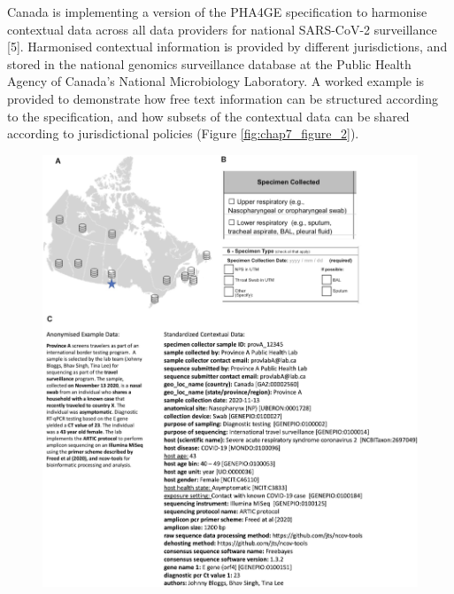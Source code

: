 Canada is implementing a version of the PHA4GE specification to harmonise contextual data across all data providers for national SARS-CoV-2 surveillance [5]. Harmonised contextual information is provided by different jurisdictions, and stored in the national genomics surveillance database at the Public Health Agency of Canada’s National Microbiology Laboratory. A worked example is provided to demonstrate how free text information can be structured according to the specification, and how subsets of the contextual data can be shared according to jurisdictional policies (Figure \ref{fig:chap7_figure_2}). 

\begin{figure}[h!]
\centering
\includegraphics[width=\textwidth]{figures/chapter 7/giac003fig2.jpeg}

\end{figure}
